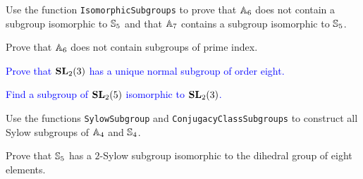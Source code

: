 
\begin{prob}
	\label{prob:subgroupsA6A7}
	Use the function \lstinline{IsomorphicSubgroups} to prove that
	$\mathbb{A}_{6}$ does not contain a subgroup isomorphic to $\mathbb{S}_5$ and that
	$\mathbb{A}_{7}$ contains a subgroup isomorphic to $\mathbb{S}_5$.
\end{prob}

\begin{prob}
Prove that $\mathbb{A}_6$ does not contain subgroups of prime index. 
\end{prob}

\begin{prob}
	\label{prob:normal_SL2(3)}
	\textcolor{blue}{
	Prove that $\mathbf{SL}_2(3)$ has a unique normal subgroup of order eight. }
\end{prob}


\begin{prob}
	\label{prob:SL2(5)}
	\textcolor{blue}{Find a subgroup of $\mathbf{SL}_2(5)$ isomorphic to $\mathbf{SL}_2(3)$.}
\end{prob}

\begin{prob}
  Use the functions \lstinline{SylowSubgroup} and 
  \lstinline{ConjugacyClassSubgroups} to construct all Sylow subgroups 
  of $\mathbb{A}_4$ and $\mathbb{S}_4$.
\end{prob}

\begin{prob}
  Prove that $\mathbb{S}_5$ has a $2$-Sylow subgroup isomorphic to the dihedral group
  of eight elements. 
\end{prob}

